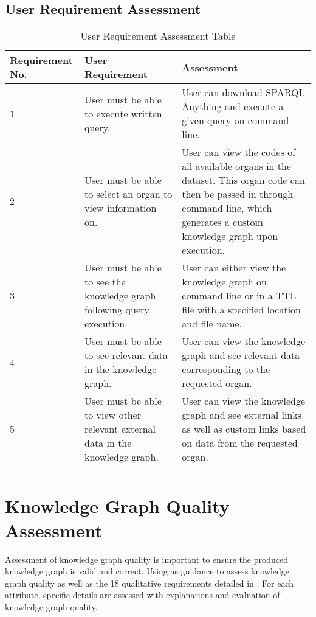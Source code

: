 \subsection{User Requirement Assessment}

\begin{longtable}{|p{2.25cm}|p{4.5cm}|p{6.5cm}|}
\hline
\textbf{Requirement No.} & \textbf{User Requirement} & \textbf{Assessment}\\
\hline

1& 
User must be able to execute written query. &
User can download SPARQL Anything \cite{sparqlanythinggithub} and execute a given query on command line. \\
\hline

2&
User must be able to select an organ to view information on. &
User can view the codes of all available organs in the dataset. This organ code can then be passed in through command line, which generates a custom knowledge graph upon execution. \\
\hline

3&
User must be able to see the knowledge graph following query execution. &
User can either view the knowledge graph on command line or in a TTL file with a specified location and file name. \\
\hline

4&
User must be able to see relevant data in the knowledge graph. &
User can view the knowledge graph and see relevant data corresponding to the requested organ. \\
\hline

5&
User must be able to view other relevant external data in the knowledge graph. &
User can view the knowledge graph and see external links as well as custom links based on data from the requested organ. \\ 
\hline

\caption{User Requirement Assessment Table}
\end{longtable}
\vspace{-1.1cm}

\section{Knowledge Graph Quality Assessment}
\hspace{0.5cm} Assessment of knowledge graph quality is important to ensure the produced knowledge graph is valid and correct. Using \cite{knowledgegraphevaulationbook} as guidance to assess knowledge graph quality as well as the 18 qualitative requirements detailed in \cite{evaluationpaper}. For each attribute, specific details are assessed with explanations and evaluation of knowledge graph quality. 

